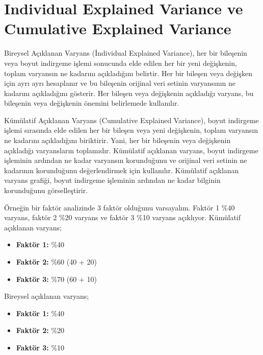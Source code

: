 \section{Individual Explained Variance ve Cumulative Explained Variance}
Bireysel Açıklanan Varyans (İndividual Explained Variance), her bir bileşenin veya boyut indirgeme işlemi sonucunda elde edilen her bir yeni değişkenin, toplam varyansın ne kadarını açıkladığını belirtir. Her bir bileşen veya değişken için ayrı ayrı hesaplanır ve bu bileşenin orijinal veri setinin varyansının ne kadarını açıkladığını gösterir. Her bileşen veya değişkenin açıkladığı varyans, bu bileşenin veya değişkenin önemini belirlemede kullanılır.

Kümülatif Açıklanan Varyans (Cumulative Explained Variance), boyut indirgeme işlemi sırasında elde edilen her bir bileşen veya yeni değişkenin, toplam varyansın ne kadarını açıkladığını biriktirir. Yani, her bir bileşenin veya değişkenin açıkladığı varyansların toplamıdır. Kümülatif açıklanan varyans, boyut indirgeme işleminin ardından ne kadar varyansın korunduğunu ve orijinal veri setinin ne kadarının korunduğunu değerlendirmek için kullanılır. Kümülatif açıklanan varyans grafiği, boyut indirgeme işleminin ardından ne kadar bilginin korunduğunu görselleştirir.

Örneğin bir faktör analizinde 3 faktör olduğunu varsayalım. Faktör 1 \%40 varyans, faktör 2 \%20 varyans ve faktör 3 \%10 varyans açıklıyor. Kümülatif açıklanan varyans; 
\begin{itemize}
	\item \textbf{Faktör 1:} \%40
	\item \textbf{Faktör 2:} \%60 (40 + 20)
	\item \textbf{Faktör 3:} \%70 (60 + 10)
\end{itemize}

Bireysel açıklanan varyans;
\begin{itemize}
	\item \textbf{Faktör 1:} \%40
	\item \textbf{Faktör 2:} \%20
	\item \textbf{Faktör 3:} \%10
\end{itemize}

\newpage
